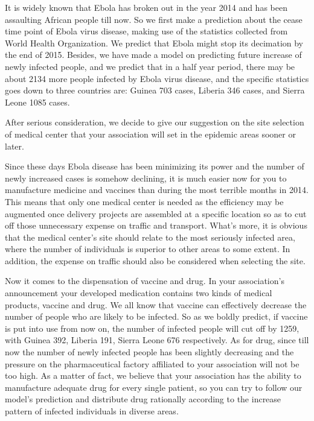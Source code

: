 \documentclass[12pt]{article}
\begin{document}
    It is widely known that Ebola has broken out in the year 2014 and has been assaulting African people till now. So we first make a prediction about the cease time point of Ebola virus disease, making use of the statistics collected from World Health Organization. We predict that Ebola might stop its decimation by the end of 2015. Besides, we have made a model on predicting future increase of newly infected people, and we predict that in a half year period, there may be about 2134 more people infected by Ebola virus disease, and the specific statistics goes down to three countries are: Guinea 703 cases, Liberia 346 cases, and Sierra Leone 1085 cases.
    
    After serious consideration, we decide to give our suggestion on the site selection of medical center that your association will set in the epidemic areas sooner or later.
    
    Since these days Ebola disease has been minimizing its power and the number of newly increased cases is somehow declining, it is much easier now for you to manufacture medicine and vaccines than during the most terrible months in 2014. This means that only one medical center is needed as the efficiency may be augmented once delivery projects are assembled at a specific location so as to cut off those unnecessary expense on traffic and transport. What's more, it is obvious that the medical center's site should relate to the most seriously infected area, where the number of individuals is superior to other areas to some extent. In addition, the expense on traffic should also be considered when selecting the site. 
    
    Now it comes to the dispensation of vaccine and drug. In your association's announcement your developed medication contains two kinds of medical products, vaccine and drug. We all know that vaccine can effectively decrease the number of people who are likely to be infected. So as we boldly predict, if vaccine is put into use from now on, the number of infected people will cut off by 1259, with Guinea 392, Liberia 191, Sierra Leone 676 respectively. As for drug, since till now the number of newly infected people has been slightly decreasing and the pressure on the pharmaceutical factory affiliated to your association will not be too high. As a matter of fact, we believe that your association has the ability to manufacture adequate drug for every single patient, so you can try to follow our model's prediction and distribute drug rationally according to the increase pattern of infected individuals in diverse areas.
    
\end{document}
